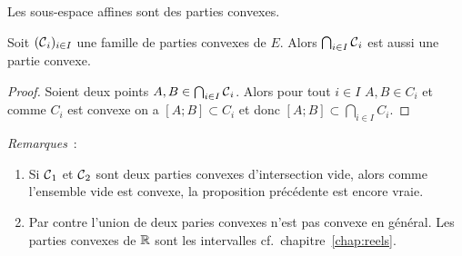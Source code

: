 \begin{cor}
  Les sous-espace affines sont des parties convexes.
\end{cor}
%
\begin{prop}
  Soit $(\mathcal{C}{}_i)_{i \in I}$ une famille de parties convexes de $E$. Alors $\bigcap_{i \in I} \mathcal{C}{}_i$ est aussi une partie convexe.
\end{prop}
\begin{proof}
  Soient deux points $A,B \in \bigcap_{i\in I} \mathcal{C}{}_i$. Alors pour tout $i \in I$ $A,B \in C_i$ et comme $C_i$ est convexe on a $[A;B] \subset C_i$ et donc $[A;B] \subset \bigcap_{i \in I} C_i$.
\end{proof}
%
\emph{Remarques}~:
\begin{enumerate}
\item Si $\mathcal{C}{}_1$ et $\mathcal{C}{}_2$  sont deux parties convexes d'intersection vide, alors comme l'ensemble vide est convexe, la proposition précédente est encore vraie.
\item Par contre l'union de deux paries convexes n'est pas convexe en général. Les parties convexes de $\mathbb{R}$ sont les intervalles cf.\ chapitre~\ref{chap:reels}.
\end{enumerate}
